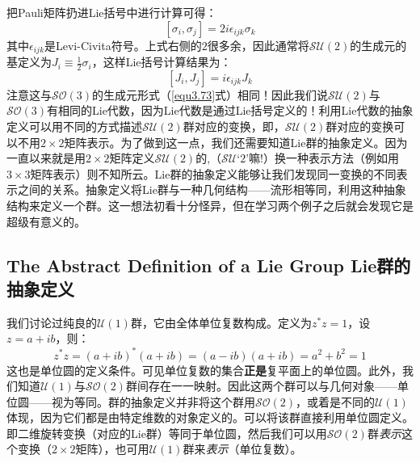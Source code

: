 把Pauli矩阵扔进Lie括号中进行计算可得：
\begin{equation}
\label{equ3.82}
[\sigma_i, \sigma_j] = 2i \epsilon_{ijk} \sigma_{k}
\end{equation}
其中$\epsilon_{ijk}$是Levi-Civita符号。上式右侧的$2$很多余，因此通常将$\mathcal{SU}(2)$的生成元的基定义为$J_i \equiv \frac{1}{2} \sigma_i$，这样Lie括号计算结果为：
\begin{equation}
\label{equ3.83}
[J_i, J_j] = i \epsilon_{ijk} J_k
\end{equation}
注意这与$\mathcal{SO}(3)$的生成元形式（\eqref{equ3.73}式）相同！因此我们说$\mathcal{SU}(2)$与$\mathcal{SO}(3)$有相同的Lie代数，因为Lie代数是通过Lie括号定义的！利用Lie代数的抽象定义可以用不同的方式描述$\mathcal{SU}(2)$群对应的变换，即，$\mathcal{SU}(2)$群对应的变换可以不用$2 \times 2$矩阵表示。为了做到这一点，我们还需要知道Lie群的抽象定义。因为一直以来就是用$2 \times 2$矩阵定义$\mathcal{SU}(2)$的,（$\mathcal{SU}$‘$2$’嘛!）换一种表示方法（例如用$3 \times 3$矩阵表示）则不知所云。Lie群的抽象定义能够让我们发现同一变换的不同表示之间的关系。抽象定义将Lie群与一种几何结构——流形相等同，利用这种抽象结构来定义一个群。这一想法初看十分怪异，但在学习两个例子之后就会发现它是超级有意义的。


\subsection[Lie群的抽象定义]{The Abstract Definition of a Lie Group \quad Lie群的抽象定义}
\label{sec3.4.4}
我们讨论过纯良的$\mathcal{U}(1)$群，它由全体单位复数构成。定义为$z^* z = 1$，设$z = a + ib$，则：
\begin{equation}
\label{equ3.84}
z^* z = (a + ib)^* (a + ib) = (a - ib)(a + ib) = a^2 + b^2 = 1
\end{equation}
这也是单位圆的定义条件。可见单位复数的集合{\bfseries 正是}复平面上的单位圆。此外，我们知道$\mathcal{U}(1)$与$\mathcal{SO}(2)$群间存在一一映射。因此这两个群可以与几何对象——单位圆——视为等同。群的抽象定义并非将这个群用$\mathcal{SO}(2)$，或着是不同的$\mathcal{U}(1)$体现，因为它们都是由特定维数的对象定义的。可以将该群直接利用单位圆定义。即二维旋转变换（对应的Lie群）等同于单位圆，然后我们可以用$\mathcal{SO}(2)$群{\itshape 表示}这个变换（$2 \times 2$矩阵），也可用$\mathcal{U}(1)$群来{\itshape 表示}（单位复数）。

